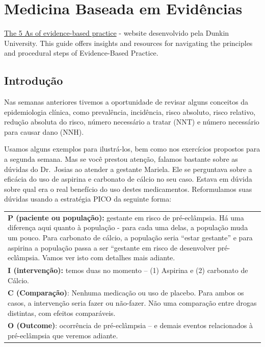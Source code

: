 \documentclass[
  letterpaper,
  DIV=11,
  numbers=noendperiod]{scrreprt}
\begin{document}

\chapter{Medicina Baseada em
Evidências}\label{medicina-baseada-em-eviduxeancias}

\href{https://deakin.libguides.com/ebp/process}{The 5 As of
evidence-based practice} - website desenvolvido pela Dunkin University.
This guide offers insights and resources for navigating the principles
and procedural steps of Evidence-Based Practice.

\section{Introdução}\label{introduuxe7uxe3o}

Nas semanas anteriores tivemos a oportunidade de revisar alguns
conceitos da epidemiologia clínica, como prevalência, incidência, risco
absoluto, risco relativo, redução absoluta do risco, número necessário a
tratar (NNT) e número necessário para causar dano (NNH).

Usamos alguns exemplos para ilustrá-los, bem como nos exercícios
propostos para a segunda semana. Mas se você prestou atenção, falamos
bastante sobre as dúvidas do Dr.~Josias ao atender a gestante Mariela.
Ele se perguntava sobre a eficácia do uso de aspirina e carbonato de
cálcio no seu caso. Estava em dúvida sobre qual era o real benefício do
uso destes medicamentos. Reformulamos suas dúvidas usando a estratégia
PICO da seguinte forma:

\begin{longtable}[]{@{}
  >{\raggedright\arraybackslash}p{}@{}}
\toprule\noalign{}
\endhead
\bottomrule\noalign{}
\endlastfoot
\textbf{P (paciente ou população):} gestante em risco de pré-eclâmpsia.
Há uma diferença aqui quanto à população - para cada uma delas, a
população muda um pouco. Para carbonato de cálcio, a população seria
``estar gestante'' e para aspirina a população passa a ser ``gestante em
risco de desenvolver pré-eclâmpsia. Vamos ver isto com detalhes mais
adiante. \\
\textbf{I (intervenção):} temos duas no momento -- (1) Aspirina e (2)
carbonato de Cálcio. \\
\textbf{C (Comparação)}: Nenhuma medicação ou uso de placebo. Para ambos
os casos, a intervenção seria fazer ou não-fazer. Não uma comparação
entre drogas distintas, com efeitos comparáveis. \\
\textbf{O (Outcome)}: ocorrência de pré-eclâmpsia -- e demais eventos
relacionados à pré-eclâmpsia que veremos adiante. \\
\end{longtable}
\end{document}
